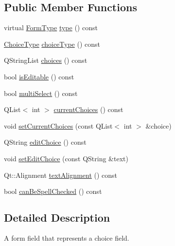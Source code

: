 \subsection*{Public Member Functions}
\begin{DoxyCompactItemize}
\item 
virtual \hyperlink{class_poppler_1_1_form_field_af9b28bf05b29780f81445b21a0ed7423}{Form\+Type} \hyperlink{class_poppler_1_1_form_field_choice_a54673d557034b798189e809a0b3120df}{type} () const
\item 
\hyperlink{class_poppler_1_1_form_field_choice_a28f7cab7585f5630e26d1b5ed832c050}{Choice\+Type} \hyperlink{class_poppler_1_1_form_field_choice_a60a88c8cd4893afaa966be8f8da54a4f}{choice\+Type} () const
\item 
Q\+String\+List \hyperlink{class_poppler_1_1_form_field_choice_aa773d5afb0a53a2c8df6f2bb61a2def5}{choices} () const
\item 
bool \hyperlink{class_poppler_1_1_form_field_choice_ad51544ab1ee11a87a373b6d16a0ed21d}{is\+Editable} () const
\item 
bool \hyperlink{class_poppler_1_1_form_field_choice_aa1ec1424a98d884c2af404174e6014ae}{multi\+Select} () const
\item 
Q\+List$<$ int $>$ \hyperlink{class_poppler_1_1_form_field_choice_a3b319f26b1f3c26829386a67c57818ee}{current\+Choices} () const
\item 
void \hyperlink{class_poppler_1_1_form_field_choice_a2817d3191458b1eb16ee017e209ca7b2}{set\+Current\+Choices} (const Q\+List$<$ int $>$ \&choice)
\item 
Q\+String \hyperlink{class_poppler_1_1_form_field_choice_a6c5a39cc1e4c74914396ad0183b40be3}{edit\+Choice} () const
\item 
void \hyperlink{class_poppler_1_1_form_field_choice_a4d1604d12cc73427f22e923b250532c6}{set\+Edit\+Choice} (const Q\+String \&text)
\item 
Qt\+::\+Alignment \hyperlink{class_poppler_1_1_form_field_choice_a81783a147e0af97a0288fd73506827d9}{text\+Alignment} () const
\item 
bool \hyperlink{class_poppler_1_1_form_field_choice_aedb493804f55f2d08c412dd7ce50b3b1}{can\+Be\+Spell\+Checked} () const
\end{DoxyCompactItemize}


\subsection{Detailed Description}
A form field that represents a choice field.

